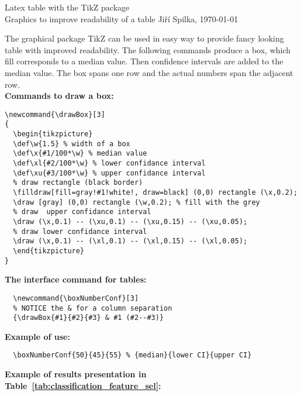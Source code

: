 \documentclass[a4paper,11pt,oneside]{report}
\newcommand{\drawBox}[3]
{
\begin{tikzpicture}
\def\w{1.5} %
\def\x{#1/100*\w} %
\def\xl{#2/100*\w} %
\def\xu{#3/100*\w} %
\filldraw[fill=gray!#1!white!, draw=black] (0,0) rectangle (\x,0.2); %
\draw [gray] (0,0) rectangle (\w,0.2); %
\draw (\x,0.1) -- (\xu,0.1) -- (\xu,0.15) -- (\xu,0.05); %
\draw (\x,0.1) -- (\xl,0.1) -- (\xl,0.15) -- (\xl,0.05); %
\end{tikzpicture} 
}
\newcommand{\boxNumberConf}[3]
{\drawBox{#1}{#2}{#3} & #1 (#2--#3)} %
\begin{document}
\begin{center}
 {\Large Latex table with the TikZ package}\\
 {Graphics to improve readability of a table}
 \vglue 0.5cm
 Ji\v{r}\'{i} Spilka, \today
 \vglue 0.5cm
\end{center}

The graphical package TikZ can be used in easy way to provide fancy looking table with improved readability.
The following commands produce a box, which fill corresponds to a median value.
Then confidence intervals are added to the median value. The box spans one row and the actual numbers span the adjacent row. \\

\noindent \textbf{Commands to draw a box:}

{\small
\begin{verbatim} 
\newcommand{\drawBox}[3]
{
  \begin{tikzpicture}
  \def\w{1.5} % width of a box
  \def\x{#1/100*\w} % median value
  \def\xl{#2/100*\w} % lower confidance interval
  \def\xu{#3/100*\w} % upper confidance interval
  % draw rectangle (black border)
  \filldraw[fill=gray!#1!white!, draw=black] (0,0) rectangle (\x,0.2); 
  \draw [gray] (0,0) rectangle (\w,0.2); % fill with the grey
  % draw  upper confidance interval
  \draw (\x,0.1) -- (\xu,0.1) -- (\xu,0.15) -- (\xu,0.05);
  % draw lower confidance interval
  \draw (\x,0.1) -- (\xl,0.1) -- (\xl,0.15) -- (\xl,0.05); 
  \end{tikzpicture} 
}
\end{verbatim}
}

\noindent \textbf{The interface command for tables:}
{\small
\begin{verbatim}
  \newcommand{\boxNumberConf}[3]
  % NOTICE the & for a column separation
  {\drawBox{#1}{#2}{#3} & #1 (#2--#3)} 
\end{verbatim}
}

\noindent \textbf{Example of use:}
{\small
\begin{verbatim} 
  \boxNumberConf{50}{45}{55} % {median}{lower CI}{upper CI}
\end{verbatim}
}

\noindent \textbf{Example of results presentation in Table~\ref{tab:classification_feature_sel}:}
\end{document}
